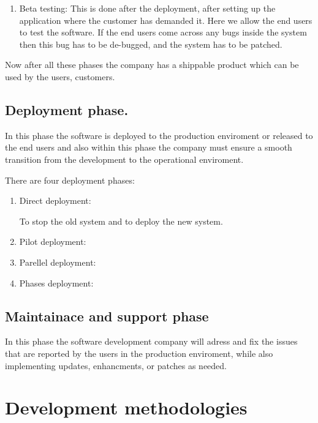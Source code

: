 \documentclass[a4paper]{article}
\begin{document}
\begin{enumerate}
\begin{enumerate}
        \item Beta testing:
            This is done after the deployment, after setting up the application where the customer has demanded it. Here we allow the end users
            to test the software. If the end users come across any bugs inside the system then this bug has to be de-bugged, and the system has to 
            be patched.

    \end{enumerate}
        
\end{enumerate}

Now after all these phases the company has a shippable product which can be used by the users, customers.


\subsection{Deployment phase.}

In this phase the software is deployed to the production enviroment or released to the end users and also within this phase the company must ensure
a smooth transition from the development to the operational enviroment.

There are four deployment phases:

\begin{enumerate}
    \item Direct deployment:

        To stop the old system and to deploy the new system.

    \item Pilot deployment: 



    \item Parellel deployment: 
    \item Phases deployment:
\end{enumerate}

\subsection{Maintainace and support phase}

In this phase the software development company will adress and fix the issues that are reported by the users in the production enviroment, while 
also implementing updates, enhancments, or patches as needed.

\section{Development methodologies}
\end{document}
